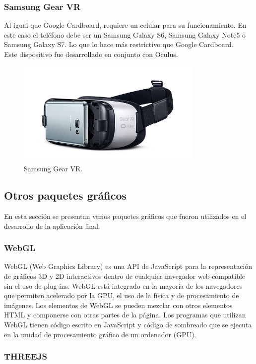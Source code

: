 \documentclass[12pt]{article}
\begin{document}
\subsubsection{Samsung Gear VR}
Al igual que Google Cardboard, requiere un celular para su funcionamiento. En este caso el teléfono debe ser un Samsung Galaxy S6, Samsung Galaxy Note5 o Samsung Galaxy S7\cite{samsungvr}. Lo que lo hace más restrictivo que Google Cardboard.
\\Este dispositivo fue desarrollado en conjunto con Oculus\cite{samsungvr}.
\begin{figure}[h!]
\includegraphics[width=0.8\textwidth,center]{samsungvr.png}
\caption{Samsung Gear VR.}
\end{figure}

\subsection{Otros paquetes gráficos}
En esta sección se presentan varios paquetes gráficos que fueron utilizados en el desarrollo de la aplicación final.
\subsubsection{WebGL}
WebGL (Web Graphics Library) es una API de JavaScript para la representación  de gráficos 3D y 2D  interactivos dentro de cualquier navegador web compatible sin el uso de plug-ins. WebGL está integrado en la mayoría de los navegadores que permiten acelerado por la GPU, el uso de la física y de procesamiento de imágenes. Los elementos de WebGL se pueden mezclar con otros elementos HTML y componerse con otras partes de la página. Los programas que utilizan WebGL tienen código escrito en JavaScript y  código de sombreado que se ejecuta en la unidad de procesamiento gráfico de un ordenador (GPU). 
\subsubsection{THREEJS}
\end{document}
